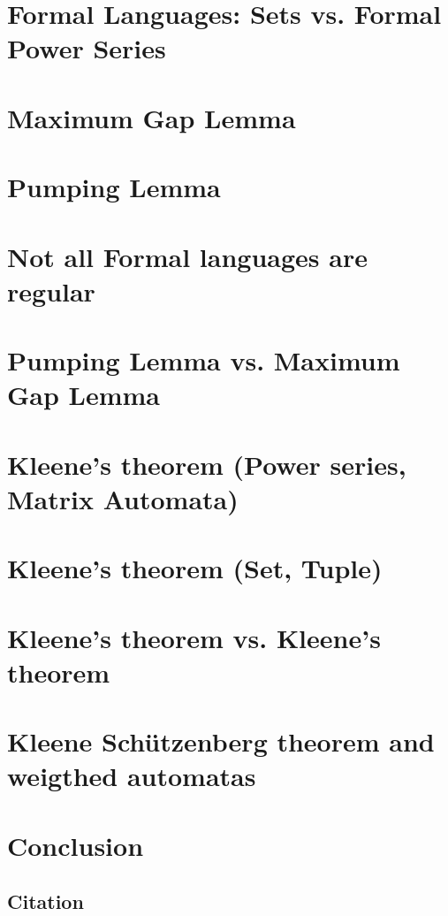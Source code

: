 \documentclass[12pt,letterpaper]{article}
\begin{document}
\section{Formal Languages: Sets vs. Formal Power Series}
\section{Maximum Gap Lemma}
\section{Pumping Lemma}
\section{Not all Formal languages are regular}
\section{Pumping Lemma vs. Maximum Gap Lemma}
\section{Kleene's theorem (Power series, Matrix Automata)}
\section{Kleene's theorem (Set, Tuple)}
\section{Kleene's theorem vs. Kleene's theorem}
\section{Kleene Schützenberg theorem and weigthed automatas}
\section{Conclusion}


\subsection{Citation} 
\label{sec:cit}
\end{document}
